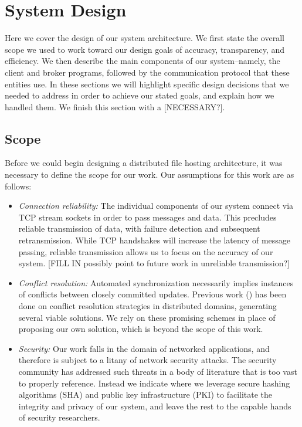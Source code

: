 \section{System Design}
\label{design}
Here we cover the design of our system architecture.
We first state the overall scope we used to work toward our design goals of accuracy, transparency, and efficiency.
We then describe the main components of our system--namely, the client and broker
programs, followed by the communication protocol that these entities use.
In these sections we will highlight specific design decisions that we needed to address
in order to achieve our stated goals,
and explain how we handled them.
We finish this section with a [NECESSARY?].

\subsection{Scope}
Before we could begin designing a distributed file hosting architecture,
it was necessary to define the scope for our work.
Our assumptions for this work are as follows:
\begin{itemize}
    \item \emph{Connection reliability:} The individual components of our system
    connect via TCP stream sockets in order to pass messages and data.
    This precludes reliable transmission of data, with failure detection
    and subsequent retransmission. While TCP handshakes will increase
    the latency of message passing, reliable transmission allows
    us to focus on the accuracy of our system.
    [FILL IN possibly point to future work in unreliable transmission?]
    \item \emph{Conflict resolution:} Automated synchronization necessarily implies
    instances of conflicts between closely committed updates.
    Previous work (\cite{shakir1998system,hurley2004collaborative}) has been done on conflict resolution strategies in distributed domains,
    generating several viable solutions.
    We rely on these promising schemes in place of proposing our own solution,
    which is beyond the scope of this work.
    \item \emph{Security:} Our work falls in the domain
    of networked applications, and therefore is subject
    to a litany of network security attacks.
    The security community has addressed such threats
    in a body of literature that is too vast to properly reference.
    Instead we indicate where we leverage secure hashing algorithms (SHA)
    and public key infrastructure (PKI) to facilitate
    the integrity and privacy of our system,
    and leave the rest to the capable hands of security researchers.
    \end{itemize}

